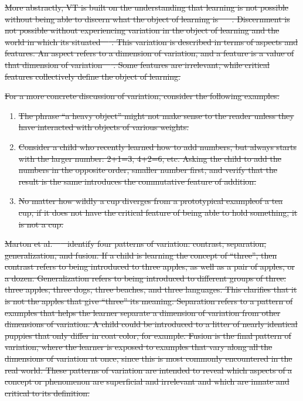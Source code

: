 \documentclass[12pt,twoside]{mitthesis}
\providecommand{\DIFdeltex}[1]{{\protect\color{red}\sout{#1}}}                      %
\providecommand{\DIFdelbegin}{} %
\providecommand{\DIFdel}[1]{\texorpdfstring{\DIFdeltex{#1}}{}} %
\begin{document}
\DIFdelbegin \DIFdel{More abstractly, VT is built on the understanding that learning is not possible without being able to discern what the object of learning is ~\mbox{%
\cite{marton1997learning}}%
. Discernment is not possible without experiencing variation in the object of learning and the world in which its situated~\mbox{%
\cite{marton2004classroom}}%
. This variation is described in terms of aspects and features. An aspect refers to a dimension of variation, and a feature is a value of that dimension of variation~\mbox{%
\cite{ling2012variation}}%
. Some features are irrelevant, while critical features collectively define the object of learning.
}%

\DIFdel{For a more concrete discussion of variation, consider the following examples:
}%
 \begin{enumerate} %
\item%
\DIFdel{The phrase “a heavy object” might not make sense to the reader unless they have interacted with objects of various weights.
}%
\item%
\DIFdel{Consider a child who recently learned how to add numbers, but always starts with the larger number: 2+1=3, 4+2=6, etc. Asking the child to add the numbers in the opposite order, smaller number first, and verify that the result is the same introduces the commutative feature of addition. }%
\item%
\DIFdel{No matter how wildly a cup diverges from a prototypical exampleof a tea cup, if it does not have the critical feature of being able to hold something, it is not a cup. }
 \end{enumerate} %

\DIFdel{Marton et al.~\mbox{%
\cite{} }%
identify four patterns of variation: contrast, separation, generalization, and fusion. If a child is learning the concept of “three”, then contrast refers to being introduced to three apples, as well as a pair of apples, or a dozen. Generalization refers to being introduced to different groups of three: three apples, three dogs, three beaches, and three languages.
This clarifies that it is not the apples that give “three” its meaning. Separation refers to a pattern of examples that helps the learner separate a dimension of variation from other dimensions of variation. A child could be introduced to a litter of nearly identical puppies that only differ in coat color, for example.
Fusion is the final pattern of variation, where the learner is exposed to examples that vary along all the dimensions of variation at once, since this is most commonly encountered in the real world. These patterns of variation are intended to reveal which aspects of a concept or phenomenon are superficial and irrelevant and which are innate and critical to its definition. }%
\end{document}
